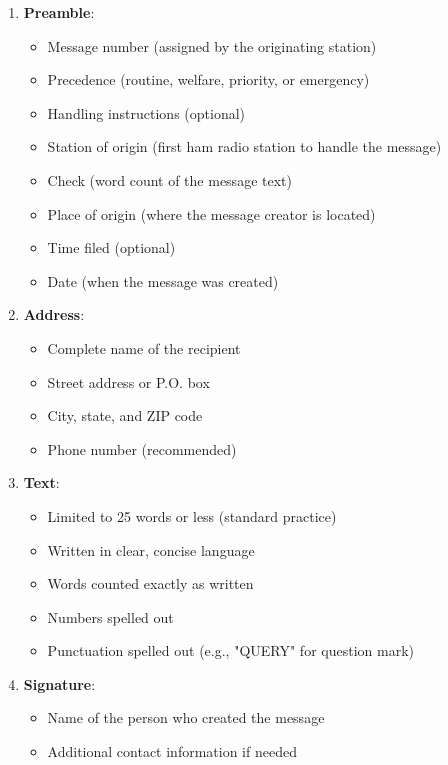 \begin{enumerate}
    \item \textbf{Preamble}:
        \begin{itemize}
            \item Message number (assigned by the originating station)
            \item Precedence (routine, welfare, priority, or emergency)
            \item Handling instructions (optional)
            \item Station of origin (first ham radio station to handle the message)
            \item Check (word count of the message text)
            \item Place of origin (where the message creator is located)
            \item Time filed (optional)
            \item Date (when the message was created)
        \end{itemize}
    
    \item \textbf{Address}:
        \begin{itemize}
            \item Complete name of the recipient
            \item Street address or P.O. box
            \item City, state, and ZIP code
            \item Phone number (recommended)
        \end{itemize}
    
    \item \textbf{Text}:
        \begin{itemize}
            \item Limited to 25 words or less (standard practice)
            \item Written in clear, concise language
            \item Words counted exactly as written
            \item Numbers spelled out
            \item Punctuation spelled out (e.g., "QUERY" for question mark)
        \end{itemize}
    
    \item \textbf{Signature}:
        \begin{itemize}
            \item Name of the person who created the message
            \item Additional contact information if needed
        \end{itemize}
\end{enumerate}


